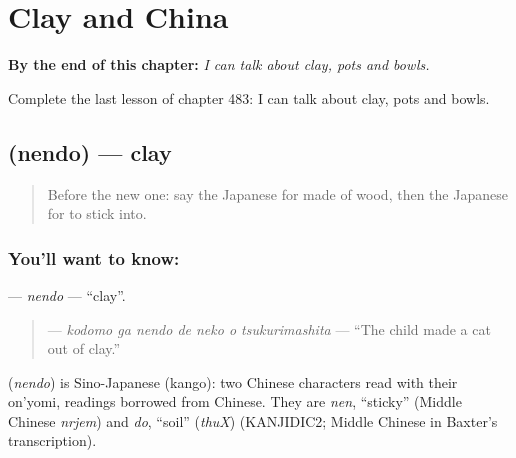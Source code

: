 
\chapter{Clay and China}
\label{ch:ja-clay-and-china}

\begin{chapteropening}
\textbf{By the end of this chapter:} \emph{I can talk about clay, pots and bowls.}

Complete the last lesson of chapter 483: I can talk about clay, pots and bowls.
\end{chapteropening}

\section[\texorpdfstring{\ja{ねんど} (nendo)}{ねんど (nendo)}]{ (nendo) — clay}

\label{lesson:JA-C483-nendo}



\begin{quote}
Before the new one: say the Japanese for made of wood, then the Japanese for to stick into.
\end{quote}

\subsection*{You'll want to know: }
\textbf{} — \emph{nendo} — \textquotedblleft{}clay\textquotedblright{}.

\begin{quote}
\textbf{   } — \emph{kodomo ga nendo de neko o tsukurimashita} — \textquotedblleft{}The child made a cat out of clay.\textquotedblright{}
\end{quote}

\begin{cousinweb}
\textbf{} (\emph{nendo}) is Sino-Japanese (kango): two Chinese characters read with their on'yomi, readings borrowed from Chinese. They are \emph{nen}, \textquotedblleft{}sticky\textquotedblright{} (Middle Chinese \emph{nrjem}) and \emph{do}, \textquotedblleft{}soil\textquotedblright{} (\emph{thuX}) (KANJIDIC2; Middle Chinese in Baxter's transcription).
\end{cousinweb}

